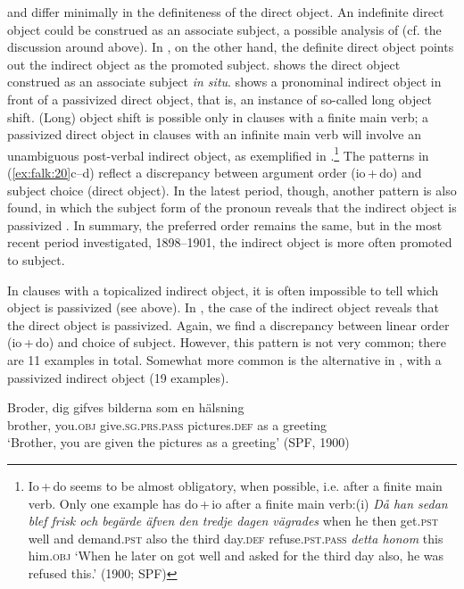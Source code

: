 \documentclass[output=paper]{langscibook}
\begin{document}
 and  differ minimally in the definiteness of the direct object. An indefinite direct object could be construed as an associate subject, a possible analysis of  (cf. the discussion around  above). In , on the other hand, the definite direct object points out the indirect object as the promoted subject.  shows the direct object construed as an associate subject \textit{in situ}.  shows a pronominal indirect object in front of a passivized direct object, that is, an instance of so-called long object shift. (Long) object shift is possible only in clauses with a finite main verb; a passivized direct object in clauses with an infinite main verb will involve an unambiguous post-verbal indirect object, as exemplified in .\footnote{Io\,+\,do seems to be almost obligatory, when possible, i.e. after a finite main verb. Only one example has do\,+\,io after a finite main verb:(i)  \textit{Då    han  sedan  blef    frisk  och  begärde    äfven  den  tredje  dagen  vägrades}   when  he    then  get.\textsc{pst}  well  and  demand.\textsc{pst}  also    the  third  day.\textsc{def}  refuse\textsc{.pst.pass}      \textit{detta  honom}   this  him.\textsc{obj}  ‘When he later on got well and asked for the third day also, he was refused this.’ (1900; SPF)} The patterns in (\ref{ex:falk:20}c–d) reflect a discrepancy between argument order (io\,+\,do) and subject choice (direct object). In the latest period, though, another pattern is also found, in which the subject form of the pronoun reveals that the indirect object is passivized . In summary, the preferred order remains the same, but in the most recent period investigated, 1898–1901, the indirect object is more often promoted to subject.


In clauses with a topicalized indirect object, it is often impossible to tell which object is passivized (see  above). In , the case of the indirect object reveals that the direct object is passivized. Again, we find a discrepancy between linear order (io\,+\,do) and choice of subject. However, this pattern is not very common; there are 11 examples in total. Somewhat more common is the alternative in , with a passivized indirect object (19 examples).


\ea%
    \label{ex:falk:21}
\ea \label{ex:falk:21a}
\gll Broder,  dig    gifves            bilderna      som  en  hälsning\\
      brother,  you.\textsc{obj}  give.\textsc{sg.prs.pass}  pictures\textsc{.def}  as    a  greeting\\
\glt ‘Brother, you are given the pictures as a greeting’ (SPF, 1900)
\end{document}
